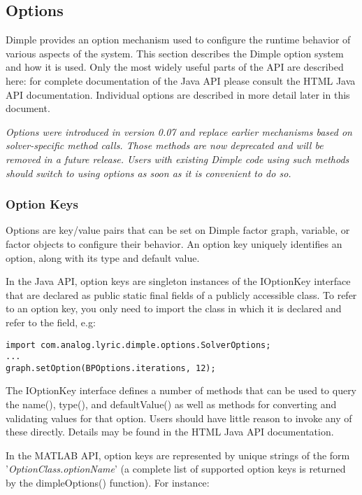 \subsection{Options}
\label{sec:Options}

Dimple provides an option mechanism used to configure the runtime behavior of various aspects of the system. This section describes the Dimple option system and how it is used. \ifjava Only the most widely useful parts of the API are described here: for complete documentation of the Java API please consult the HTML Java API documentation. \fi Individual options are described in more detail later in this document.

\textit{Options were introduced in version 0.07 and replace earlier mechanisms based on solver-specific method calls. Those methods are now deprecated and will be removed in a future release. Users with existing Dimple code using such methods should switch to using options as soon as it is convenient to do so.}

\subsubsection{Option Keys}

Options are key/value pairs that can be set on Dimple factor graph, variable, or factor objects to configure their behavior. An option key uniquely identifies an option, along with its type and default value. 

\ifjava 
In the Java API, option keys are singleton instances of the IOptionKey interface that are declared as public static final fields of a publicly accessible class. To refer to an option key, you only need to import the class in which it is declared and refer to the field, e.g:

\begin{lstlisting}
import com.analog.lyric.dimple.options.SolverOptions;
...
graph.setOption(BPOptions.iterations, 12);
\end{lstlisting}

The IOptionKey interface defines a number of methods that can be used to query the name(), type(), and defaultValue() as well as methods for converting and validating values for that option. Users should have little reason to invoke any of these directly. Details may be found in the HTML Java API documentation.

\fi

\ifmatlab
In the MATLAB API, option keys are represented by unique strings of the form '\textit{OptionClass.optionName}' (a complete list of supported option keys is returned by the dimpleOptions() function). For instance:

